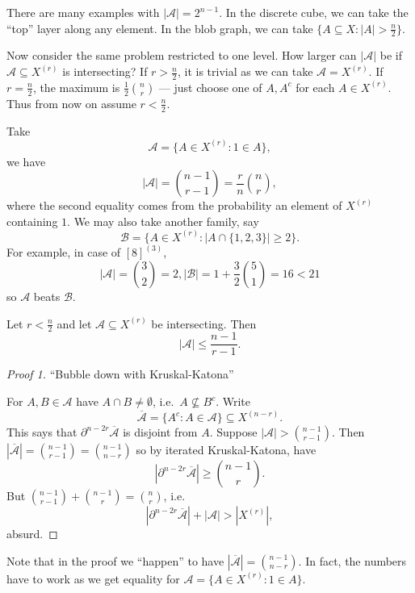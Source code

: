 \documentclass[a4paper]{article}
\newcommand{\shadow}{\partial}
\begin{document}
\begin{note}
  There are many examples with \(|\mathcal A| = 2^{n - 1}\). In the discrete cube, we can take the ``top'' layer along any element. In the blob graph, we can take \(\{A \subseteq X: |A| > \frac{n}{2}\}\).
\end{note}

Now consider the same problem restricted to one level. How larger can \(|\mathcal A|\) be if \(\mathcal A \subseteq X^{(r)}\) is intersecting? If \(r > \frac{n}{2}\), it is trivial as we can take \(\mathcal A = X^{(r)}\). If \(r = \frac{n}{2}\), the maximum is \(\frac{1}{2} \binom{n}{r}\) --- just choose one of \(A, A^c\) for each \(A \in X^{(r)}\). Thus from now on assume \(r < \frac{n}{2}\).

Take
\[
  \mathcal A = \{A \in X^{(r)}: 1 \in A\},
\]
we have
\[
  |\mathcal A| = \binom{n - 1}{r - 1} = \frac{r}{n} \binom{n}{r},
\]
where the second equality comes from the probability an element of \(X^{(r)}\) containing \(1\). We may also take another family, say
\[
  \mathcal B = \{A \in X^{(r)}: |A \cap \{1, 2, 3\}| \geq 2\}.
\]
For example, in case of \([8]^{(3)}\),
\[
  |\mathcal A| = \binom{3}{2} = 2, |\mathcal B| = 1 + \frac{3}{2} \binom{5}{1} = 16 < 21
\]
so \(\mathcal A\) beats \(\mathcal B\).

\begin{theorem}
  Let \(r < \frac{n}{2}\) and let \(\mathcal A \subseteq X^{(r)}\) be intersecting. Then
  \[
    |\mathcal A| \leq \frac{n - 1}{r - 1}.
  \]
\end{theorem}

\begin{proof}[Proof 1]
  ``Bubble down with Kruskal-Katona''

  For \(A, B \in \mathcal A\) have \(A \cap B \neq \emptyset\), i.e.\ \(A \nsubseteq B^c\). Write
  \[
    \overline{\mathcal A} = \{A^c: A \in \mathcal A\} \subseteq X^{(n - r)}.
  \]
  This says that \(\shadow^{n - 2r}\overline{\mathcal A}\) is disjoint from \(A\). Suppose \(|\mathcal A| > \binom{n - 1}{r - 1}\). Then \(|\overline{\mathcal A}| = \binom{n - 1}{r - 1} = \binom{n - 1}{n - r}\) so by iterated Kruskal-Katona, have
  \[
    |\shadow^{n - 2r} \overline{\mathcal A}| \geq \binom{n - 1}{r}.
  \]
  But \(\binom{n - 1}{r - 1} + \binom{n - 1}{r} = \binom{n}{r}\), i.e.
  \[
    |\shadow^{n - 2r} \overline{\mathcal A}| + |\mathcal A| > |X^{(r)}|,
  \]
  absurd.
\end{proof}

\begin{remark}
  Note that in the proof we ``happen'' to have \(|\overline{\mathcal A}| = \binom{n - 1}{n - r}\). In fact, the numbers have to work as we get equality for \(\mathcal A = \{A \in X^{(r)}: 1 \in A\}\).
\end{remark}
\end{document}
